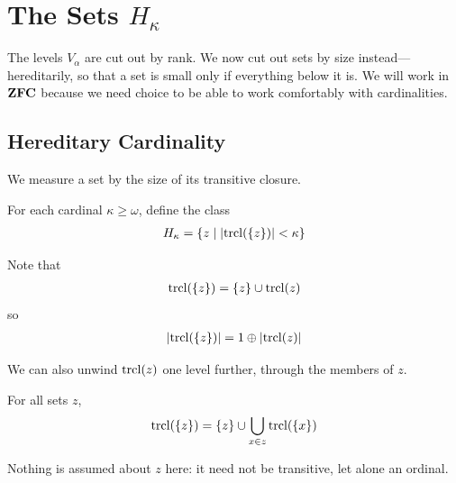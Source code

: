 \section{The Sets $H_{\kappa}$}

The levels $V_{\alpha}$ are cut out by rank. We now cut out sets by size instead---hereditarily, so that a set is small only if everything below it is. We will work in $\mathbf{ZFC}$ because we need choice to be able to work comfortably with cardinalities.

\subsection{Hereditary Cardinality}

We measure a set by the size of its transitive closure.

\begin{boxdefinition}[$H_{\kappa}$]
    For each cardinal $\kappa \geq \omega$, define the class
    \begin{align*}
        H_{\kappa} = \left\{ z \; \middle\vert \; \left\lvert \operatorname{trcl}\!\left( \left\{ z \right\} \right) \right\rvert < \kappa \right\}
    \end{align*}
\end{boxdefinition}

Note that
\begin{align*}
    \operatorname{trcl}\!\left( \left\{ z \right\} \right) = \left\{ z \right\} \cup \operatorname{trcl}\!\left( z \right)
\end{align*}
so
\begin{align*}
    \left\lvert \operatorname{trcl}\!\left( \left\{ z \right\} \right) \right\rvert = 1 \oplus \left\lvert \operatorname{trcl}\!\left( z \right) \right\rvert
\end{align*}

We can also unwind $\operatorname{trcl}\!\left( z \right)$ one level further, through the members of $z$.

\begin{boxproposition}
    For all sets $z$,
    \begin{align*}
        \operatorname{trcl}\!\left( \left\{ z \right\} \right) = \left\{ z \right\} \cup \bigcup_{x \in z} \operatorname{trcl}\!\left( \left\{ x \right\} \right)
    \end{align*}
\end{boxproposition}

Nothing is assumed about $z$ here: it need not be transitive, let alone an ordinal.

